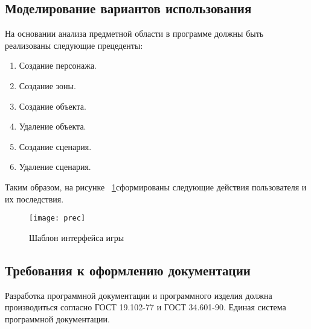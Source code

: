 \subsection{ Моделирование вариантов использования}
На основании анализа предметной области в программе должны быть реализованы следующие прецеденты:
\begin{enumerate}
\item Создание персонажа.
\item Создание зоны.
\item Создание объекта.
\item Удаление объекта.
\item Создание сценария.
\item Удаление сценария.
\end{enumerate}
Таким образом, на рисунке ~\ref{prec:image}сформированы следующие действия пользователя и их последствия.
\begin{figure}[ht]
	\texttt{[image: prec]}
	\caption{Шаблон интерфейса игры}
	\label{prec:image}
\end{figure}

\subsection{Требования к оформлению документации}

Разработка программной документации и программного изделия должна производиться согласно ГОСТ 19.102-77 и ГОСТ 34.601-90. Единая система программной документации.
